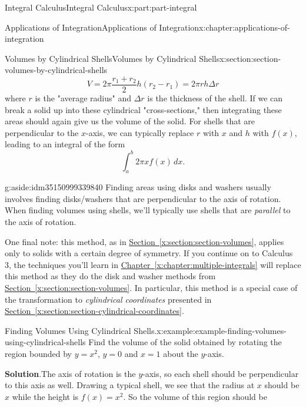 \documentclass[twoside,10pt,]{tufte-book}
\newcommand{\blocktitlefont}{\relax}
\newcommand{\xreffont}{\relax}
\numberwithin{equation}{part}
\begin{document}
\begin{partptx}{Integral Calculus}{}{Integral Calculus}{}{}{x:part:part-integral}
\begin{chapterptx}{Applications of Integration}{}{Applications of Integration}{}{}{x:chapter:applications-of-integration}
\begin{sectionptx}{Volumes by Cylindrical Shells}{}{Volumes by Cylindrical Shells}{}{}{x:section:section-volumes-by-cylindrical-shells}
\begin{equation}
V = 2\pi\frac{r_{1} + r_{2}}{2}h(r_{2} - r_{1}) = 2\pi rh\Delta r\label{x:men:equation-volume-cylindrical-shell}
\end{equation}
where \(r\) is the "average radius" and \(\Delta r\) is the thickness of the shell. If we can break a solid up into these cylindrical "cross-sections," then integrating these areas should again give us the volume of the solid. For shells that are perpendicular to the \(x\)-axis, we can typically replace \(r\) with \(x\) and \(h\) with \(f(x)\), leading to an integral of the form%
\begin{equation*}
\int_{a}^{b}2\pi xf(x)\,dx.
\end{equation*}
\begin{aside}{}{g:aside:idm35150999339840}%
Finding areas using disks and washers usually involves finding disks\slash{}washers that are perpendicular to the axis of rotation. When finding volumes using shells, we'll typically use shells that are \emph{parallel} to the axis of rotation.%
\end{aside}
%
\par
One final note: this method, as in \hyperref[x:section:section-volumes]{Section~{\xreffont\ref{x:section:section-volumes}}}, applies only to solids with a certain degree of symmetry. If you continue on to Calculus 3, the techniques you'll learn in \hyperref[x:chapter:multiple-integrals]{Chapter~{\xreffont\ref{x:chapter:multiple-integrals}}} will replace this method as they do the disk and washer methods from \hyperref[x:section:section-volumes]{Section~{\xreffont\ref{x:section:section-volumes}}}. In particular, this method is a special case of the transformation to \emph{cylindrical coordinates} presented in \hyperref[x:section:section-cylindrical-coordinates]{Section~{\xreffont\ref{x:section:section-cylindrical-coordinates}}}.%
\begin{example}{Finding Volumes Using Cylindrical Shells.}{x:example:example-finding-volumes-using-cylindrical-shells}%
Find the volume of the solid obtained by rotating the region bounded by \(y = x^{2}\), \(y = 0\) and \(x = 1\) about the \(y\)-axis.%
\par\smallskip%
\noindent\textbf{\blocktitlefont Solution}.\hypertarget{g:solution:idm35150999333952}{}\quad{}The axis of rotation is the \(y\)-axis, so each shell should be perpendicular to this axis as well. Drawing a typical shell, we see that the radius at \(x\) should be \(x\) while the height is \(f(x) = x^{2}\). So the volume of this region should be%

\end{example}
\end{sectionptx}
\end{chapterptx}
\end{partptx}
\end{document}
